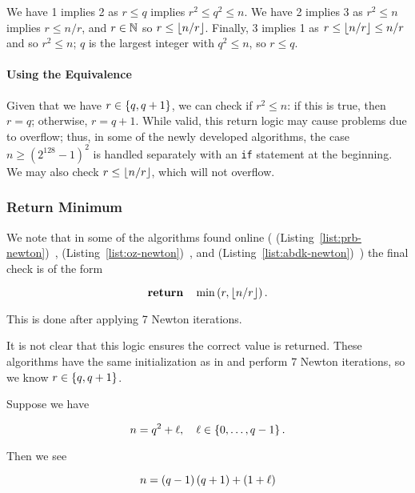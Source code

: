 \noindent
We have 1 implies 2 as $r\le q$ implies $r^{2} \le q^{2} \le n$.
We have 2 implies 3 as $r^{2} \le n$ implies $r \le n/r$,
and $r\in\mathbb{N}$ so $r \le \left\lfloor n/r \right\rfloor$.
Finally, 3 implies 1 as $r \le \left\lfloor n/r \right\rfloor \le n/r$
and so $r^{2} \le n$;
$q$ is the largest integer with $q^{2} \le n$, so $r \le q$.

\paragraph{Using the Equivalence}
Given that we have $r\in\left\{ q,q+1 \right\}$,
we can check if $r^{2}\le n$:
if this is true, then $r=q$; otherwise, $r=q+1$.
While valid,
this return logic may cause problems due to overflow;
thus, in some of the newly developed algorithms,
the case $n\ge(2^{128}-1)^{2}$ is handled separately with an \texttt{if}
statement at the beginning.
We may also check $r\le \left\lfloor n/r \right\rfloor$,
which will not overflow.

\subsubsection{Return Minimum}
We note that in some of the algorithms found online
(\prb{} (Listing~\ref{list:prb-newton})~\cite{prb-math},
\OpenZeppelin{} (Listing~\ref{list:oz-newton})~\cite{open-zeppelin}, and
\abdk{} (Listing~\ref{list:abdk-newton})~\cite{abdk-consulting})
the final check is of the form

\begin{equation}
    \Return \quad\min\parens{r, \floor{n/r}}.
\end{equation}

\noindent
This is done after applying 7 Newton iterations.

It is not clear that this logic ensures the correct value is returned.
These algorithms have the same initialization
as in \UnrolledOne{} and perform 7 Newton iterations, so we know
$r\in\left\{ q, q+1 \right\}$.

Suppose we have

\begin{equation}
    n = q^{2} + \ell, \quad\ell\in\left\{ 0,\dots,q-1 \right\}.
    \label{eq:return_min:n_def}
\end{equation}

\noindent
Then we see

\begin{equation}
    n = \left( q-1 \right)\left( q+1 \right) + \left( 1+\ell \right)
\end{equation}

